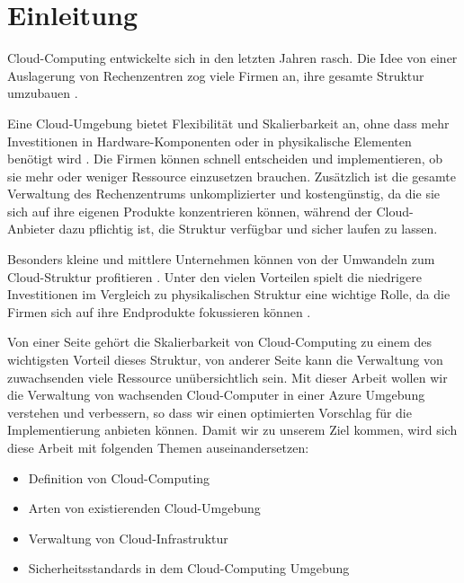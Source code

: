 \section{Einleitung}

Cloud-Computing entwickelte sich in den letzten Jahren rasch. Die Idee von einer Auslagerung von Rechenzentren zog viele Firmen an, ihre gesamte Struktur umzubauen \citep{Alalawi_CCR}. 

Eine Cloud-Umgebung bietet Flexibilität und Skalierbarkeit an, ohne dass mehr Investitionen in Hardware-Komponenten oder in physikalische Elementen benötigt wird \citep{Obrutsky_CSAD}. Die Firmen können schnell entscheiden und implementieren, ob sie mehr oder weniger Ressource einzusetzen brauchen. Zusätzlich ist die gesamte Verwaltung des Rechenzentrums unkomplizierter und kostengünstig, da die sie sich auf ihre eigenen Produkte konzentrieren können, während der Cloud-Anbieter dazu pflichtig ist, die Struktur verfügbar und sicher laufen zu lassen.

Besonders kleine und mittlere Unternehmen können von der Umwandeln zum Cloud-Struktur profitieren \citep{Khalid_CCAI}. Unter den vielen Vorteilen spielt die niedrigere Investitionen im Vergleich zu physikalischen Struktur eine wichtige Rolle, da die Firmen sich auf ihre Endprodukte fokussieren können \citep{Donnery_CCSB}.

Von einer Seite gehört die Skalierbarkeit von Cloud-Computing zu einem des wichtigsten Vorteil dieses Struktur, von anderer Seite kann die Verwaltung von zuwachsenden viele Ressource unübersichtlich sein. Mit dieser Arbeit wollen wir die Verwaltung von wachsenden Cloud-Computer in einer Azure Umgebung verstehen und verbessern, so dass wir einen optimierten Vorschlag für die Implementierung anbieten können. Damit wir zu unserem Ziel kommen, wird sich diese Arbeit mit folgenden Themen auseinandersetzen:

\begin{itemize}
   \item Definition von Cloud-Computing
   \item Arten von existierenden Cloud-Umgebung
   \item Verwaltung von Cloud-Infrastruktur
   \item Sicherheitsstandards in dem Cloud-Computing Umgebung
\end{itemize}